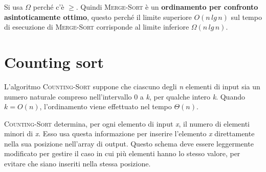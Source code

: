 \documentclass[10pt, a4paper]{report}
\begin{document}
Si usa $\Omega$ perché c'è $\geq$. Quindi \textsc{Merge-Sort} è un \textbf{ordinamento per confronto asintoticamente ottimo}, questo perché il limite superiore $O(n\,lg\,n)$ sul tempo di esecuzione di \textsc{Merge-Sort} corrisponde al limite inferiore $\Omega(n\,lg\,n)$.
\section{Counting sort}
L'algoritmo \textsc{Counting-Sort} suppone che ciascuno degli \textit{n} elementi di input sia un numero naturale compreso nell'intervallo 0 a \textit{k}, per qualche intero \textit{k}. Quando $k = O(n)$, l'ordinamento viene effettuato nel tempo $\Theta(n)$.

\textsc{Counting-Sort} determina, per ogni elemento di input \textit{x}, il numero di elementi minori di \textit{x}. Esso usa questa informazione per inserire l'elemento \textit{x} direttamente nella sua posizione nell'array di output. Questo schema deve essere leggermente modificato per gestire il caso in cui più elementi hanno lo stesso valore, per evitare che siano inseriti nella stessa posizione.
\end{document}
